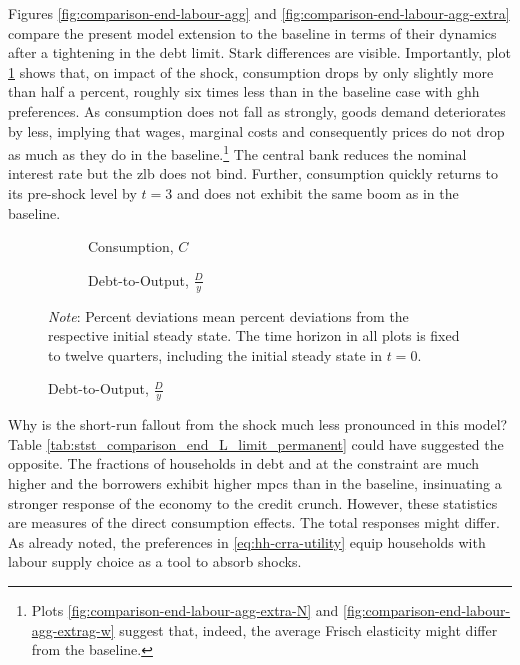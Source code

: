 \documentclass[a4paper,12pt]{article} %
\numberwithin{equation}{section} %
\numberwithin{figure}{section}
\numberwithin{table}{section}
\begin{document}
Figures \ref{fig:comparison-end-labour-agg} and \ref{fig:comparison-end-labour-agg-extra} compare the present model extension to the baseline in terms of their dynamics after a tightening in the debt limit. Stark differences are visible. Importantly, plot \ref{fig:comparison-end-labour-c} shows that, on impact of the shock, consumption drops by only slightly more than half a percent, roughly six times less than in the baseline case with \Gls{ghh} preferences. As consumption does not fall as strongly, goods demand deteriorates by less, implying that wages, marginal costs and consequently prices do not drop as much as they do in the baseline.\footnote{Plots \ref{fig:comparison-end-labour-agg-extra-N} and \ref{fig:comparison-end-labour-agg-extrag-w} suggest that, indeed, the average Frisch elasticity might differ from the baseline.} The central bank reduces the nominal interest rate but the \Gls{zlb} does not bind. Further, consumption quickly returns to its pre-shock level by $t=3$ and does not exhibit the same boom as in the baseline. 

\begin{figure}[t]
    \caption{Endogenous Labour Supply -- Shock to the Borrowing Limit: Aggregate Dynamics}
    \label{fig:comparison-end-labour-agg}
    \centering
    \begin{subfigure}[b]{0.49\textwidth}
    \caption{Consumption, $C$}
    \label{fig:comparison-end-labour-c}
         \centering
         
     \end{subfigure}
     \hfill
    \begin{subfigure}[b]{0.49\textwidth}
    \caption{Debt-to-Output, $\frac{D}{y}$}
    \label{fig:comparison-end-labour-DY}
         \centering
         
     \end{subfigure}
     
     \vspace{10pt}
     
     \justifying
     \footnotesize
	\textit{Note}: Percent deviations mean percent deviations from the respective initial steady state. The time horizon in all plots is fixed to twelve quarters, including the initial steady state in $t=0$.
\end{figure}

Why is the short-run fallout from the shock much less pronounced in this model? Table \ref{tab:stst_comparison_end_L_limit_permanent} could have suggested the opposite. The fractions of households in debt and at the constraint are much higher and the borrowers exhibit higher \Gls{mpc}s than in the baseline, insinuating a stronger response of the economy to the credit crunch. However, these statistics are measures of the direct consumption effects. The total responses might differ. As already noted, the preferences in \eqref{eq:hh-crra-utility} equip households with labour supply choice as a tool to absorb shocks.
\end{document}
